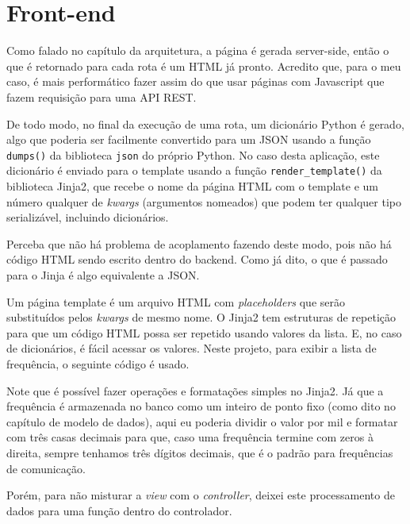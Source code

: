 \chapter{Front-end}

Como falado no capítulo da arquitetura, a página é gerada server-side, então o que 
é retornado para cada rota é um HTML já pronto. Acredito que, para o meu caso, é mais 
performático fazer assim do que usar páginas com Javascript que fazem requisição para uma API REST.

De todo modo, no final da execução de uma rota, um dicionário Python é gerado, algo que 
poderia ser facilmente convertido para um JSON usando a função \texttt{dumps()} da 
biblioteca \texttt{json} do próprio Python. No caso desta aplicação, este dicionário é 
enviado para o template usando a função \texttt{render\_template()} da biblioteca Jinja2, 
que recebe o nome da página HTML com o template e um número qualquer de \textit{kwargs} (argumentos nomeados) 
que podem ter qualquer tipo serializável, incluindo dicionários.

Perceba que não há problema de acoplamento fazendo deste modo, pois não há código HTML sendo 
escrito dentro do backend. Como já dito, o que é passado para o Jinja é algo equivalente a JSON.

Um página template é um arquivo HTML com \textit{placeholders} que serão substituídos pelos 
\textit{kwargs} de mesmo nome. O Jinja2 tem estruturas de repetição para que um código HTML 
possa ser repetido usando valores da lista. E, no caso de dicionários, é fácil acessar 
os valores. Neste projeto, para exibir a lista de frequência, o seguinte código é usado.



Note que é possível fazer operações e formatações simples no Jinja2. Já que a frequência 
é armazenada no banco como um inteiro de ponto fixo (como dito no capítulo de modelo de dados), 
aqui eu poderia dividir o valor por mil e formatar com três casas decimais para que, caso 
uma frequência termine com zeros à direita, sempre tenhamos três dígitos decimais, que 
é o padrão para frequências de comunicação.

Porém, para não misturar a \textit{view} com o \textit{controller}, deixei este processamento 
de dados para uma função dentro do controlador.



